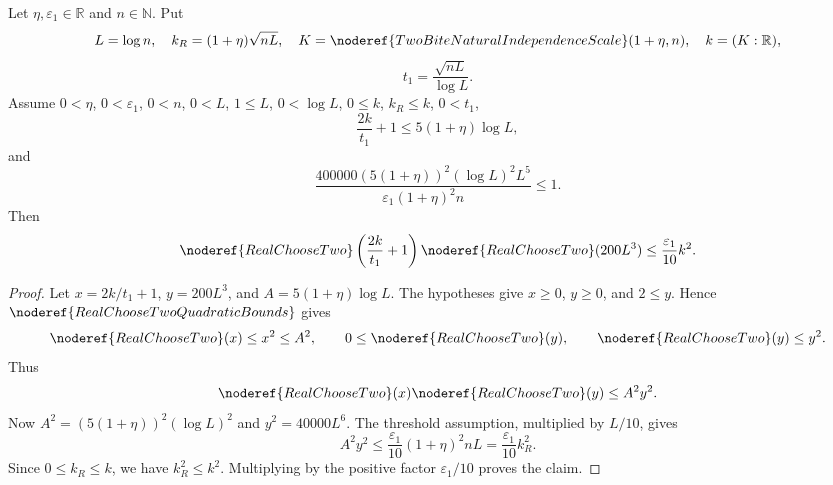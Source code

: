 \begin{helper}
Let \(\eta,\varepsilon_1\in\mathbb R\) and \(n\in\mathbb N\).  Put
\[
L=\log n,\quad
k_R=(1+\eta)\sqrt{nL},\quad
K=\noderef{TwoBiteNaturalIndependenceScale}(1+\eta,n),\quad k=(K:\mathbb R),
\]
\[
t_1=\frac{\sqrt{nL}}{\log L}.
\]
Assume \(0<\eta\), \(0<\varepsilon_1\), \(0<n\), \(0<L\), \(1\le L\),
\(0<\log L\), \(0\le k\), \(k_R\le k\), \(0<t_1\),
\[
\frac{2k}{t_1}+1\le5(1+\eta)\log L,
\]
and
\[
\frac{400000(5(1+\eta))^2(\log L)^2L^5}
{\varepsilon_1(1+\eta)^2n}\le1.
\]
Then
\[
\noderef{RealChooseTwo}\left(\frac{2k}{t_1}+1\right)
\noderef{RealChooseTwo}(200L^3)\le\frac{\varepsilon_1}{10}k^2.
\]
\end{helper}
\begin{proof}
Let \(x=2k/t_1+1\), \(y=200L^3\), and \(A=5(1+\eta)\log L\).
The hypotheses give \(x\ge0\), \(y\ge0\), and \(2\le y\).  Hence
\(\noderef{RealChooseTwoQuadraticBounds}\) gives
\[
\noderef{RealChooseTwo}(x)\le x^2\le A^2,\qquad
0\le\noderef{RealChooseTwo}(y),\qquad
\noderef{RealChooseTwo}(y)\le y^2.
\]
Thus
\[
\noderef{RealChooseTwo}(x)\noderef{RealChooseTwo}(y)\le A^2y^2.
\]
Now \(A^2=(5(1+\eta))^2(\log L)^2\) and \(y^2=40000L^6\).  The threshold
assumption, multiplied by \(L/10\), gives
\[
A^2y^2\le\frac{\varepsilon_1}{10}(1+\eta)^2nL
=\frac{\varepsilon_1}{10}k_R^2.
\]
Since \(0\le k_R\le k\), we have \(k_R^2\le k^2\).  Multiplying by the
positive factor \(\varepsilon_1/10\) proves the claim.
\end{proof}
